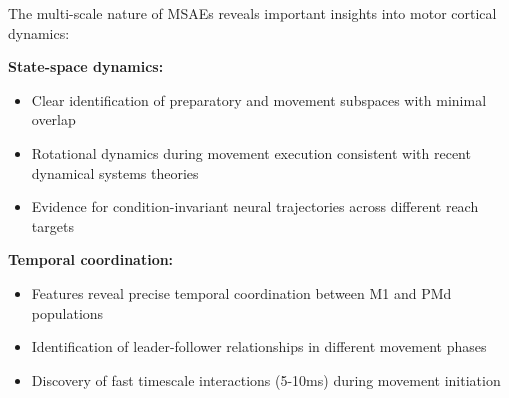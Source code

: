 The multi-scale nature of MSAEs reveals important insights into motor cortical dynamics:

\textbf{State-space dynamics:}
\begin{itemize}
\item Clear identification of preparatory and movement subspaces with minimal overlap
\item Rotational dynamics during movement execution consistent with recent dynamical systems theories
\item Evidence for condition-invariant neural trajectories across different reach targets
\end{itemize}

\textbf{Temporal coordination:}
\begin{itemize}
\item Features reveal precise temporal coordination between M1 and PMd populations
\item Identification of leader-follower relationships in different movement phases
\item Discovery of fast timescale interactions (5-10ms) during movement initiation
\end{itemize}

